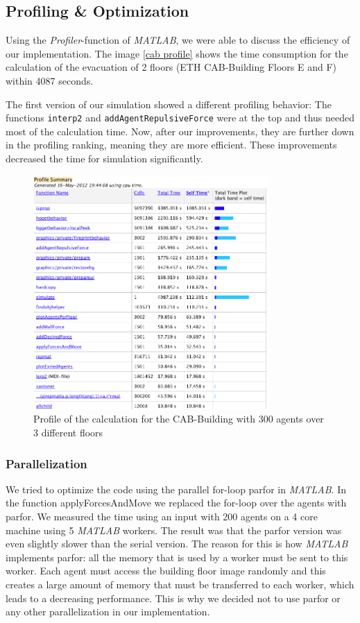 \documentclass[11pt]{article}
\begin{document}
\subsection{Profiling \& Optimization}


Using the \textit{Profiler}-function of \textit{MATLAB}, we were able to discuss
the efficiency of our implementation. The image \vref{cab profile} shows the
time consumption for the calculation of the evacuation of 2 floors (ETH
CAB-Building Floors E and F) within 4087 seconds.

The first version of our simulation showed a different profiling behavior: The
functions \verb+interp2+ and \verb+addAgentRepulsiveForce+ were at the top and
thus needed most of the calculation time. Now, after our improvements, they are
further down in the profiling ranking, meaning they are more efficient. These
improvements decreased the time for simulation significantly.

\begin{figure}[h]
\centering
\includegraphics[width=0.8\textwidth]{./images/profiler.png}
\caption{Profile of the calculation for the CAB-Building with 300 agents over 3 different floors} 
\label{cab profile}
\end{figure}

\subsubsection{Parallelization}

We tried to optimize the code using the parallel for-loop parfor in \textit{MATLAB}. In
the function applyForcesAndMove we replaced the for-loop over the agents with
parfor. We measured the time using an input with 200 agents on a 4 core machine
using 5 \textit{MATLAB} workers. The result was that the parfor version was even slightly
slower than the serial version. The reason for this is how \textit{MATLAB} implements
parfor: all the memory that is used by a worker must be sent to this worker.
Each agent must access the building floor image randomly and this creates a
large amount of memory that must be transferred to each worker, which leads to a
decreasing performance.
This is why we decided not to use parfor or any other parallelization in our
implementation.
\end{document}
